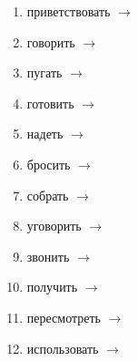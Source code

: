 \documentclass[paper=a4, fontsize=11pt]{scrartcl}
\begin{document}
\begin{enumerate}
    \item приветствовать $\rightarrow$ \underline{\hspace{4cm}}
    \item говорить $\rightarrow$ \underline{\hspace{4cm}}
    \item пугать $\rightarrow$ \underline{\hspace{4cm}}
    \item готовить $\rightarrow$ \underline{\hspace{4cm}}
    \item надеть $\rightarrow$ \underline{\hspace{4cm}}
    \item бросить $\rightarrow$ \underline{\hspace{4cm}}
    \item собрать $\rightarrow$ \underline{\hspace{4cm}}
    \item уговорить $\rightarrow$ \underline{\hspace{4cm}}
    \item звонить $\rightarrow$ \underline{\hspace{4cm}}
    \item получить $\rightarrow$ \underline{\hspace{4cm}}
    \item пересмотреть $\rightarrow$ \underline{\hspace{4cm}}
    \item использовать $\rightarrow$ \underline{\hspace{4cm}}
\end{enumerate}
\end{document}
